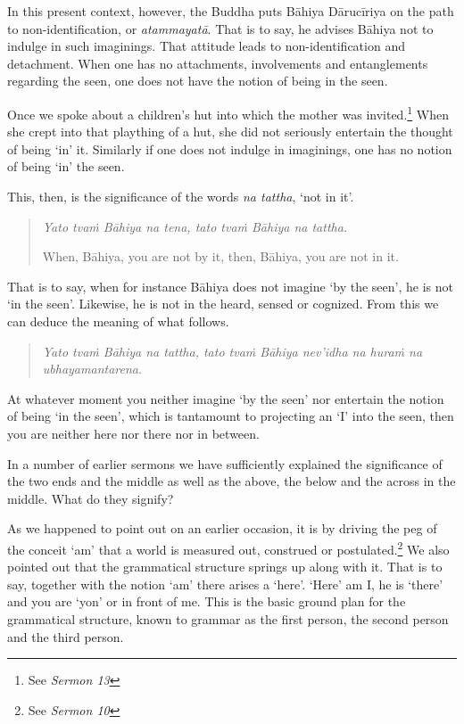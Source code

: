 In this present context, however, the Buddha puts Bāhiya Dārucīriya on the path to non-identification, or \emph{atammayatā}. That is to say, he advises Bāhiya not to indulge in such imaginings. That attitude leads to non-identification and detachment. When one has no attachments, involvements and entanglements regarding the seen, one does not have the notion of being in the seen.

Once we spoke about a children's hut into which the mother was invited.\footnote{See \emph{Sermon 13}} When she crept into that plaything of a hut, she did not seriously entertain the thought of being `in' it. Similarly if one does not indulge in imaginings, one has no notion of being `in' the seen.

This, then, is the significance of the words \emph{na tattha}, `not in it'.

\begin{quote}
\emph{Yato tvaṁ Bāhiya na tena, tato tvaṁ Bāhiya na tattha.}

When, Bāhiya, you are not by it, then, Bāhiya, you are not in it.
\end{quote}

That is to say, when for instance Bāhiya does not imagine `by the seen', he is not `in the seen'. Likewise, he is not in the heard, sensed or cognized. From this we can deduce the meaning of what follows.

\begin{quote}
\emph{Yato tvaṁ Bāhiya na tattha, tato tvaṁ Bāhiya nev'idha na huraṁ na ubhayamantarena}.
\end{quote}

At whatever moment you neither imagine `by the seen' nor entertain the notion of being `in the seen', which is tantamount to projecting an `I' into the seen, then you are neither here nor there nor in between.

In a number of earlier sermons we have sufficiently explained the significance of the two ends and the middle as well as the above, the below and the across in the middle. What do they signify?

As we happened to point out on an earlier occasion, it is by driving the peg of the conceit `am' that a world is measured out, construed or postulated.\footnote{See \emph{Sermon 10}} We also pointed out that the grammatical structure springs up along with it. That is to say, together with the notion `am' there arises a `here'. `Here' am I, he is `there' and you are `yon' or in front of me. This is the basic ground plan for the grammatical structure, known to grammar as the first person, the second person and the third person.

